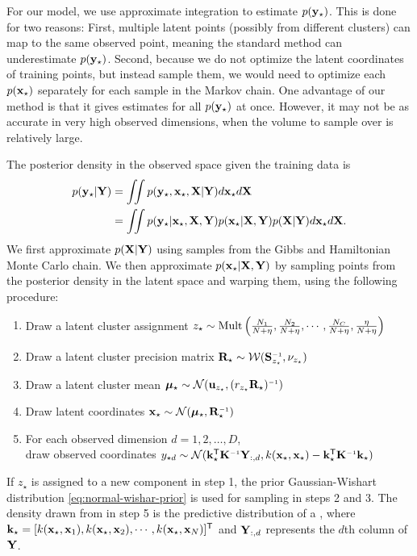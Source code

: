 For our model, we use approximate integration to estimate $p({\bf{y}}_\star)$.
This is done for two reasons:
First, multiple latent points (possibly from different clusters) can map to the same observed point, meaning the standard method can underestimate $p({\bf{y}}_\star)$.
Second, because we do not optimize the latent coordinates of training points, but instead sample them, we would need to optimize each $p({\bf{x}}_\star)$ separately for each sample in the Markov chain.
One advantage of our method is that it gives estimates for all $p({\bf{y}}_\star)$ at once.
However, it may not be as accurate in very high observed dimensions, when the volume to sample over is relatively large.

The posterior density in the observed space given the training data is
%
\begin{align}
p({\bf{y}}_\star | \mathbf{Y})
& = \int \!\!\! \int p({\bf{y}}_\star,{\bf{x}}_\star, \mathbf{X} | \mathbf{Y})d{\bf{x}}_\star d\mathbf{X} \nonumber\\
& = \int\!\!\! \int p({\bf{y}}_\star | {\bf{x}}_\star, \mathbf{X}, \mathbf{Y})p({\bf{x}}_\star|\mathbf{X},\mathbf{Y})p(\mathbf{X}|\mathbf{Y})d{\bf{x}}_\star d\mathbf{X}.
\label{eq:density}
\end{align}
%
We first approximate $p(\mathbf{X} | \mathbf{Y})$ using samples from the Gibbs and Hamiltonian Monte Carlo chain.
We then approximate $p({\bf{x}}_\star | \mathbf{X}, \mathbf{Y})$ by sampling points from the posterior density in the latent space and warping them, using the following procedure:
%
\begin{enumerate}
\item Draw a latent cluster assignment $z_\star \sim {\rm Mult} \left( \frac{N_{1}}{N+\eta}, \frac{N_{2}}{N+\eta}, \cdots,\frac{N_{C}}{N+\eta},\frac{\eta}{N+\eta} \right)$
\item Draw a latent cluster precision matrix $\vR_\star \sim {\cal W}(\vS\inv_{z_\star},\nu_{z_\star})$
\item Draw a latent cluster mean $\vmu_\star \sim {\cal N}(\vu_{z_\star},(r_{z_\star}\vR_\star)\inv)$
\item Draw latent coordinates $\vx_\star \sim {\cal N}(\vmu_\star,\vR_\star\inv)$
\item For each observed dimension $d = 1, 2, \ldots, D$, \\ draw observed coordinates 
$y_{\star d} \sim {\cal N}(\vk_\star\tra \vK\inv \vY_{:,d}, k(\vx_\star,\vx_\star) - \vk_\star\tra \vK\inv \vk_\star)$
\end{enumerate}
%
If $z_\star$ is assigned to a new component in step 1, the prior Gaussian-Wishart distribution \eqref{eq:normal-wishar-prior} is used for sampling in steps 2 and 3.
The density drawn from in step 5 is the predictive distribution of a \gp{}, where
%
${\bf{k}}_\star=[ k({\bf{x}}_\star, {\bf{x}}_1), k({\bf{x}}_\star, {\bf{x}}_2), \cdots, k({\bf{x}}_\star, {\bf{x}}_N)]^{\mathsf{T}}$ and $\mathbf{Y}_{:,d}$ represents the $d$th column of $\mathbf{Y}$.

